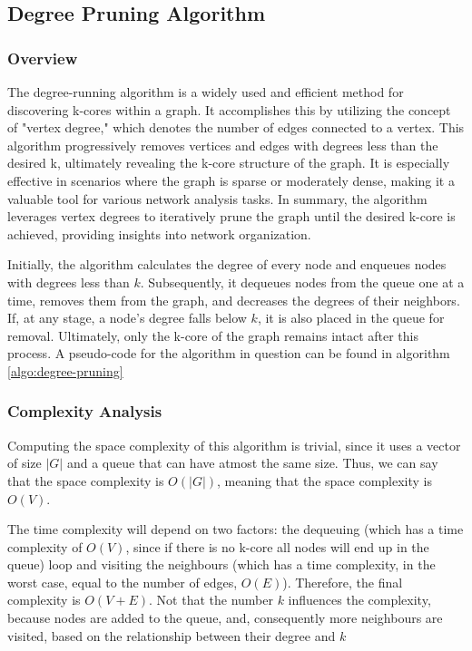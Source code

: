 \label{Algorithms}

\subsection{Degree Pruning Algorithm}

\subsubsection{Overview}

The degree-running algorithm is a widely used and efficient method for discovering k-cores within a graph. It accomplishes this by utilizing the concept of "vertex degree," which denotes the number of edges connected to a vertex. This algorithm progressively removes vertices and edges with degrees less than the desired k, ultimately revealing the k-core structure of the graph. It is especially effective in scenarios where the graph is sparse or moderately dense, making it a valuable tool for various network analysis tasks. In summary, the algorithm leverages vertex degrees to iteratively prune the graph until the desired k-core is achieved, providing insights into network organization.

Initially, the algorithm calculates the degree of every node and enqueues nodes with degrees less than $k$. Subsequently, it dequeues nodes from the queue one at a time, removes them from the graph, and decreases the degrees of their neighbors. If, at any stage, a node's degree falls below $k$, it is also placed in the queue for removal. Ultimately, only the k-core of the graph remains intact after this process. A pseudo-code for the algorithm in question can be found in algorithm \ref{algo:degree-pruning}



\subsubsection{Complexity Analysis}

Computing the space complexity of this algorithm is trivial, since it uses a vector of size $|G|$ and a queue that can have atmost the same size. Thus, we can say that the space complexity is $O(|G|)$, meaning that the space complexity is $O(V)$.

The time complexity will depend on two factors: the dequeuing (which has a time complexity of $O(V)$, since if there is no k-core all nodes will end up in the queue) loop and visiting the neighbours (which has a time complexity, in the worst case, equal to the number of edges, $O(E)$). Therefore, the final complexity is $O(V + E)$. Not that the number $k$ influences the complexity, because nodes are added to the queue, and, consequently more neighbours are visited, based on the relationship between their degree and $k$

